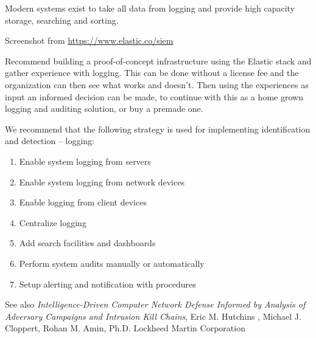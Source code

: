 \documentclass[Screen16to9,17pt]{foils}
\begin{document}
Modern systems exist to take all data from logging and provide high capacity storage, searching and sorting.


Screenshot from \url{https://www.elastic.co/siem}

Recommend building a proof-of-concept infrastructure using the Elastic stack and gather experience with logging. This can be done without a license fee and the organization can then see what works and doesn't. Then using the experiences as input an informed decision can be made, to continue with this as a home grown logging and auditing solution, or buy a premade one.





We recommend that the following strategy is used for implementing identification and detection -- logging:
\begin{enumerate}
\item[\faSquareO] Enable system logging from servers
\item[\faSquareO] Enable system logging from network devices
\item[\faSquareO] Enable logging from client devices
\item[\faSquareO] Centralize logging
\item[\faSquareO] Add search facilities and dashboards
\item[\faSquareO] Perform system audits manually or automatically
\item[\faSquareO] Setup alerting and notification with procedures
\end{enumerate}





\begin{list2}
\item See also \emph{Intelligence-Driven Computer Network Defense Informed by Analysis of Adversary Campaigns and Intrusion Kill Chains}, Eric M. Hutchins , Michael J. Cloppert, Rohan M. Amin, Ph.D. Lockheed Martin Corporation\\{\footnotesize
 }
\end{list2}
\end{document}
